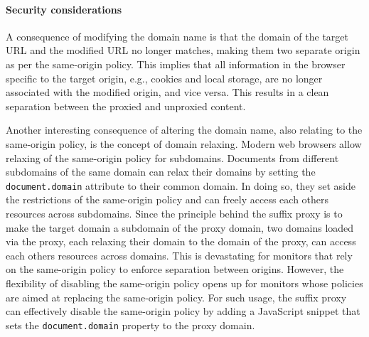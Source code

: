 \documentclass{llncs}
\newcommand{\todo}[1]{\colorbox{red}{\textcolor{white}{\sffamily\bfseries\scriptsize TODO}} \textcolor{red}{#1} \textcolor{red}{$\blacktriangleleft$}}
\begin{document}






\paragraph{Security considerations}

A consequence of modifying the domain name is that the domain of the
target URL and the modified URL no longer matches, making them two 
separate origin as per the same-origin policy. This implies that all information in 
the browser specific to the target origin, e.g., cookies and local storage, 
are no longer associated with the modified origin, and vice versa. This results 
in a clean separation between the proxied and unproxied content.  

Another interesting consequence of altering the domain name, also relating to 
the same-origin policy, is the concept of domain relaxing. Modern web browsers 
allow relaxing of the same-origin policy for subdomains. Documents from different subdomains of the same 
domain can relax their domains by setting the \lstinline{document.domain} attribute
to their common domain. In doing so, they set aside the restrictions of the 
same-origin policy and can freely access each others resources across subdomains. 
Since the principle behind the suffix proxy is to make the target domain a subdomain of the proxy domain, two 
domains loaded via the proxy, each relaxing their domain to the domain of the 
proxy, can access each others resources across domains.
This is devastating for monitors that rely on the same-origin policy to enforce 
separation between origins. However, the flexibility of disabling the same-origin
policy opens up for monitors whose policies are aimed
at replacing the same-origin policy. 
For such usage, the suffix proxy can effectively disable the same-origin 
policy by adding a JavaScript snippet that sets the \lstinline{document.domain} property
to the proxy domain. 
\end{document}
